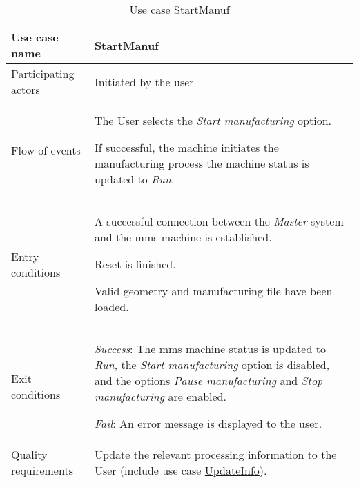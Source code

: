 \begin{table}
  \captionsetup{justification=raggedright, singlelinecheck=false}
  \caption{Use case StartManuf}
  \centering
  \begin{tabular}{p{}p{}}
    \hline
    Use case name & \textbf{StartManuf} \\ \hline
     Participating actors      & Initiated by the user \\ \hline
     Flow of events & \begin{enum-c}
     \item The User selects the \emph{Start manufacturing} option.
     \item If successful, the machine initiates the manufacturing process
       the machine status is updated to \emph{Run}.
     \end{enum-c}\\ \hline 
     Entry conditions       & \begin{enum-c}
     \item A successful connection between the \emph{Master} system
     and the \gls{mms} machine is established. 
      \item Reset is finished.
      \item Valid geometry and manufacturing file have been loaded.
     \end{enum-c}\\ \hline 
      Exit conditions & \begin{item-c}
      \item \emph{Success}: The \gls{mms} machine status is updated to \emph{Run}, the
        \emph{Start manufacturing} option is disabled, and the options
       \emph{Pause manufacturing} and \emph{Stop manufacturing} are enabled.
     \item \emph{Fail}: An error message is displayed to the user.
      \end{item-c}\\ \hline
      Quality requirements & Update the relevant processing information to the
        User (include use case \underline{UpdateInfo}). \\ \hline 
  \end{tabular}
\label{tab:us-start-manuf}
\end{table}

